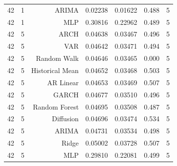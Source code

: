\begin{table}[!htbp]
\begin{tabular}{lrrrrrr}
42 & 1 & ARIMA & 0.02238 & 0.01622 & 0.488 & 5 \\
42 & 1 & MLP & 0.30816 & 0.22962 & 0.489 & 5 \\
42 & 5 & ARCH & 0.04638 & 0.03467 & 0.496 & 5 \\
42 & 5 & VAR & 0.04642 & 0.03471 & 0.494 & 5 \\
42 & 5 & Random Walk & 0.04646 & 0.03465 & 0.000 & 5 \\
42 & 5 & Historical Mean & 0.04652 & 0.03468 & 0.503 & 5 \\
42 & 5 & AR Linear & 0.04653 & 0.03469 & 0.507 & 5 \\
42 & 5 & GARCH & 0.04677 & 0.03510 & 0.496 & 5 \\
42 & 5 & Random Forest & 0.04695 & 0.03508 & 0.487 & 5 \\
42 & 5 & Diffusion & 0.04696 & 0.03474 & 0.534 & 5 \\
42 & 5 & ARIMA & 0.04731 & 0.03534 & 0.498 & 5 \\
42 & 5 & Ridge & 0.05002 & 0.03728 & 0.507 & 5 \\
42 & 5 & MLP & 0.29810 & 0.22081 & 0.499 & 5 \\
\bottomrule
\end{tabular}
\end{table}
